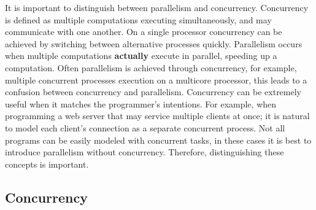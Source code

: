 
%



It is important to distinguish between parallelism and concurrency.
Concurrency is defined as multiple computations executing simultaneously,
and may communicate with one another.
On a single processor concurrency can be achieved by switching between
alternative processes quickly.
Parallelism occurs when multiple computations \textbf{actually} execute in parallel,
speeding up a computation.
Often parallelism is achieved through concurrency,
for example, multiple concurrent processes execution on a multicore processor,
this leads to a confusion between concurrency and parallelism.
Concurrency can be extremely useful when it matches the programmer's intentions.
For example,
when programming a web server that may service multiple clients at once;
it is natural to model each client's connection as a separate concurrent process.
Not all programs can be easily modeled with concurrent tasks,
in these cases it is best to introduce parallelism without concurrency.
Therefore, distinguishing these concepts is important.

\subsection{Concurrency}
\label{sec:backgnd_concurrency}

